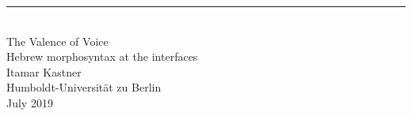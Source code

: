 \singlespacing
\begin{center}
\rule{165pt}{0pt} \\
\vspace{1cm}
\LARGE{The Valence of Voice}\\
\vspace{1cm}
\Large{Hebrew morphosyntax at the interfaces}\\
\vspace{2cm}
\large{Itamar Kastner} \\
\vspace{0.4cm}
\normalsize{Humboldt-Universit\"at zu Berlin} \\
\vspace{1cm}
\normalsize{July 2019} %

\end{center}
